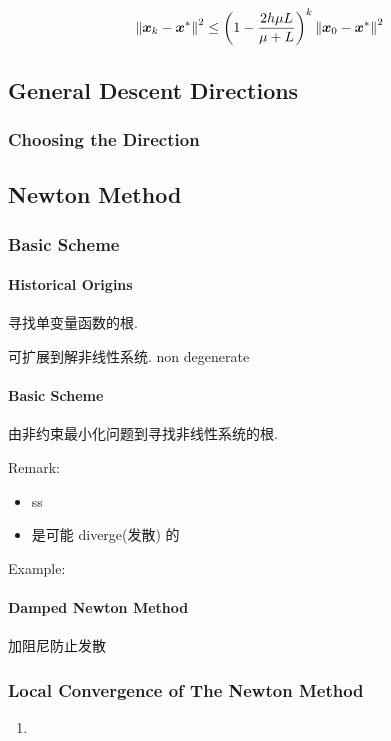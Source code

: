 \begin{theorem}
    \begin{align*}
        \left\lVert\bm{x}_k-\bm{x}^*\right\rVert^2\le \left( 1-\frac{2h\mu L}{\mu+L} \right)^k \left\lVert\bm{x}_0-\bm{x}^*\right\rVert^2
    \end{align*}
\end{theorem}

\subsection{General Descent Directions}
\subsubsection{Choosing the Direction}


\subsection{Newton Method}
\subsubsection{Basic Scheme}
\paragraph{Historical Origins} 寻找单变量函数的根. 

可扩展到解非线性系统. non degenerate

\paragraph{Basic Scheme}由非约束最小化问题到寻找非线性系统的根.

Remark: 
\begin{itemize}
    \item ss
    \item 是可能 diverge(发散) 的
\end{itemize}

Example:

\paragraph{Damped Newton Method}加阻尼防止发散

\subsubsection{Local Convergence of The Newton Method}
\begin{enumerate}
    \item 
\end{enumerate}

